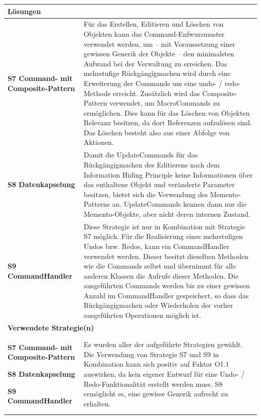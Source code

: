 \documentclass[fontsize=12pt,paper=a4,twoside]{scrartcl}
\begin{document}
\begin{tabularx}{\textwidth}{|p{6cm}|X|}
\hline
\multicolumn{2}{|l|}{\textbf{Lösungen}} \\\hline

\textbf{S7 Command- mit Composite-Pattern} & Für das Erstellen, Editieren und Löschen von Objekten kann das Command-Enfwursmuster verwendet werden, um -- mit Voraussetzung einer gewissen Generik der Objekte -- den minimalsten Aufwand  bei der Verwaltung zu erreichen. Das mehrstufige Rückgängigmachen wird durch eine Erweiterung der Commands um eine undo- / redo-Methode erreicht. Zusätzlich wird das Composite-Pattern verwendet, um MacroCommands zu ermöglichen. Dies kann für das Löschen von Objekten Relevanz besitzen, da dort Referenzen aufzulösen sind. Das Löschen besteht also aus einer Abfolge von Aktionen.\\\hline
\textbf{S8 Datenkapselung} & Damit die UpdateCommands für das Rückgängigmachen des Editierens nach dem Information Hiding Principle keine Informationen über das enthaltene Objekt und veränderte Parameter besitzen, bietet sich die Verwendung des Memento-Patterns an. UpdateCommands kennen dann nur die Memento-Objekte, aber nicht deren internen Zustand.\\
\textbf{S9 CommandHandler} & Diese Strategie ist nur in Kombination mit Strategie S7 möglich. Für die Realisierung eines mehrstufigen Undos bzw. Redos, kann ein CommandHandler verwendet werden. Dieser besitzt dieselben Methoden wie die Commands selbst und übernimmt für alle anderen Klassen die Aufrufe dieser Methoden. Die ausgeführten Commands werden bis zu einer gewissen Anzahl im CommandHandler gespeichert, so dass das Rückgängigmachen oder Wiederholen der vorher ausgeführten Operationen möglich ist.\\\hline
 
\multicolumn{2}{|l|}{\textbf{Verwendete Strategie(n)}} \\\hline
\textbf{S7 Command- mit Composite-Pattern}\newline

\textbf{S8 Datenkapselung}\newline

\textbf{S9 CommandHandler}   & Es wurden aller der aufgeführte Strategien gewählt. Die Verwendung von Strategie S7 und S9 in Kombination kann sich positiv auf Faktor O1.1 auswirken, da kein eigener Entwurf für eine Undo- / Redo-Funktionalität erstellt werden muss. S8 ermöglicht es, eine gewisse Generik aufrecht zu erhalten.\\\hline
\end{tabularx}
\end{document}

